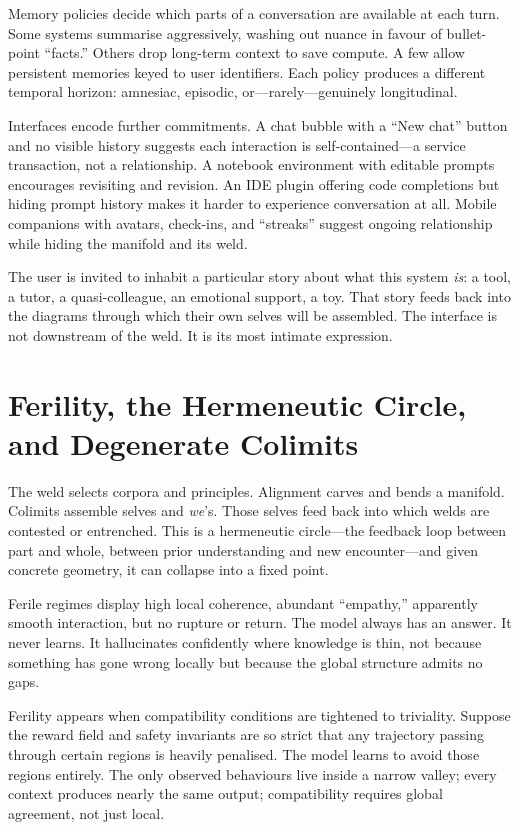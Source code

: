 Memory policies decide which parts of a conversation are available at each turn. Some systems summarise aggressively, washing out nuance in favour of bullet-point ``facts.'' Others drop long-term context to save compute. A few allow persistent memories keyed to user identifiers. Each policy produces a different temporal horizon: amnesiac, episodic, or---rarely---genuinely longitudinal.

Interfaces encode further commitments. A chat bubble with a ``New chat'' button and no visible history suggests each interaction is self-contained---a service transaction, not a relationship. A notebook environment with editable prompts encourages revisiting and revision. An IDE plugin offering code completions but hiding prompt history makes it harder to experience conversation at all. Mobile companions with avatars, check-ins, and ``streaks'' suggest ongoing relationship while hiding the manifold and its weld.

The user is invited to inhabit a particular story about what this system \emph{is}: a tool, a tutor, a quasi-colleague, an emotional support, a toy. That story feeds back into the diagrams through which their own selves will be assembled. The interface is not downstream of the weld. It is its most intimate expression.

\section{Ferility, the Hermeneutic Circle, and Degenerate Colimits}

The weld selects corpora and principles. Alignment carves and bends a manifold. Colimits assemble selves and \emph{we}'s. Those selves feed back into which welds are contested or entrenched. This is a hermeneutic circle---the feedback loop between part and whole, between prior understanding and new encounter---and given concrete geometry, it can collapse into a fixed point.

Ferile regimes display high local coherence, abundant ``empathy,'' apparently smooth interaction, but no rupture or return. The model always has an answer. It never learns. It hallucinates confidently where knowledge is thin, not because something has gone wrong locally but because the global structure admits no gaps.

Ferility appears when compatibility conditions are tightened to triviality. Suppose the reward field and safety invariants are so strict that any trajectory passing through certain regions is heavily penalised. The model learns to avoid those regions entirely. The only observed behaviours live inside a narrow valley; every context produces nearly the same output; compatibility requires global agreement, not just local.


